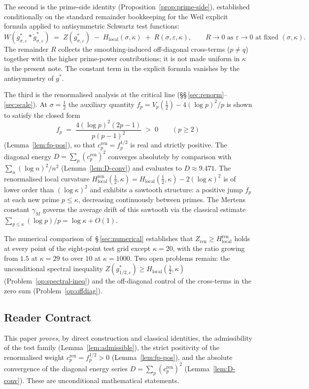 \documentclass[11pt]{article}
\newcommand{\Hlocal}{H_{\mathrm{local}}}
\newcommand{\Hren}{H_{\mathrm{local}}^{\mathrm{ren}}}
\newcommand{\cren}{c_p^{\mathrm{ren}}}
\newcommand{\Zren}{Z_{\mathrm{ren}}}
\begin{document}
The second is the prime-side identity
(Proposition~\ref{prop:prime-side}), established conditionally
on the standard remainder bookkeeping for the Weil explicit
formula applied to antisymmetric Schwartz test functions:
\[
W(g^*_{\sigma,\varepsilon}*\check g^*_{\sigma,\varepsilon})
\;=\; Z(g^*_{\sigma,\varepsilon})\;-\;\Hlocal(\sigma,\kappa)
\;+\; R(\sigma,\varepsilon,\kappa),
\qquad R\to 0\text{ as }\varepsilon\to 0
\text{ at fixed }(\sigma,\kappa).
\]
The remainder $R$ collects the smoothing-induced off-diagonal
cross-terms ($p\ne q$) together with the higher prime-power
contributions; it is not made uniform in $\kappa$ in the
present note.
The constant term in the explicit formula vanishes by the
antisymmetry of $g^*$.

The third is the renormalised analysis at the critical line
(\S\S\,\ref{sec:renorm}--\ref{sec:scale}).
At $\sigma=\tfrac12$ the auxiliary quantity
$f_p=V_p(\tfrac12)-4(\log p)^2/p$ is shown to satisfy the
closed form
\[
f_p \;=\; \frac{4(\log p)^2(2p-1)}{p(p-1)^2} \;>\; 0
\qquad (p\ge 2)
\]
(Lemma~\ref{lem:fp-pos}), so that $\cren=f_p^{1/2}$ is real
and strictly positive.
The diagonal energy $D=\sum_p(\cren)^2$ converges absolutely by
comparison with $\sum_n (\log n)^2/n^2$ (Lemma~\ref{lem:D-conv})
and evaluates to $D\approx 9.471$.
The renormalised local curvature
$\Hren(\tfrac12,\kappa)=\Hlocal(\tfrac12,\kappa)-2(\log\kappa)^2$
is of lower order than $(\log\kappa)^2$ and exhibits a sawtooth
structure: a positive jump $f_p$ at each new prime
$p\le\kappa$, decreasing continuously between primes.
The Mertens constant $\gamma_M$ governs the average drift of
this sawtooth via the classical estimate
$\sum_{p\le\kappa}(\log p)/p=\log\kappa+O(1)$.

The numerical comparison of~\S\,\ref{sec:numerical} establishes
that $\Zren\ge\Hren$ holds at every point of the eight-point
test grid except $\kappa=20$, with the ratio growing from $1.5$
at $\kappa=29$ to over $10$ at $\kappa=1000$.
Two open problems remain:
the unconditional spectral inequality
$Z(g^*_{1/2,\varepsilon})\ge\Hlocal(\tfrac12,\kappa)$
(Problem~\ref{op:spectral-ineq}) and
the off-diagonal control of the cross-terms in the zero sum
(Problem~\ref{op:offdiag}).

\subsection{Reader Contract}

This paper \emph{proves}, by direct construction and classical
identities, the admissibility of the test family
(Lemma~\ref{lem:admissible}), the strict positivity
of the renormalised weight $\cren=f_p^{1/2}>0$
(Lemma~\ref{lem:fp-pos}), and the absolute convergence of the
diagonal energy series $D=\sum_p(\cren)^2$
(Lemma~\ref{lem:D-conv}).
These are unconditional mathematical statements.
\end{document}
